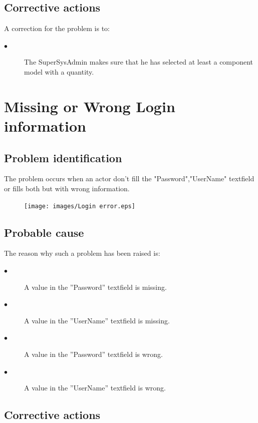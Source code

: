 \subsection{Corrective actions}

A correction for the problem is to:\\
\begin{description}
\item[$\bullet$] The SuperSysAdmin makes sure that he has selected at least a
component model with a quantity.
\end{description}



\section{Missing or Wrong Login information} 

\subsection{Problem identification}
The problem occurs when an actor don't fill the "Password","UserName" textfield
or fills both but with wrong information.

\begin{figure}[H]
\centering
\texttt{[image: images/Login error.eps]}
\caption{\label{overflow}}
\end{figure}


\subsection{Probable cause}

The reason why such a problem has been raised is:\\
\begin{description}
\item[$\bullet$] A value in the ''Password'' textfield is missing.
\item[$\bullet$] A value in the ''UserName'' textfield is missing.
\item[$\bullet$] A value in the ''Password'' textfield is wrong.
\item[$\bullet$] A value in the ''UserName'' textfield is wrong.
\end{description}


\subsection{Corrective actions}

